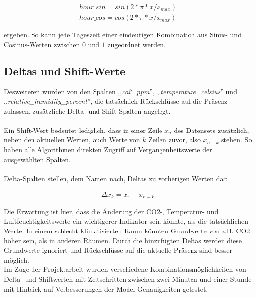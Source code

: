 \begin{align}
    hour\_sin = sin(2 * \pi * x / x_{max}) \\ 
    hour\_cos = cos(2 * \pi * x / x_{max})
\end{align} 

ergeben. So kann jede Tageszeit einer eindeutigen Kombination aus Sinus- und Cosinus-Werten zwischen 
$0$ und $1$ zugeordnet werden.

\subsection{Deltas und Shift-Werte}
Desweiteren wurden von den Spalten ,,\textit{co2\_ppm}'', ,,\textit{temperature\_celsius}'' und \break 
,,\textit{relative\_humidity\_percent}'', die tatsächlich Rückschlüsse auf die Präsenz zulassen, \break 
zusätzliche Delta- und Shift-Spalten angelegt.\\\\
Ein Shift-Wert bedeutet lediglich, dass  in einer Zeile $x_n$ des Datensets 
zusätzlich, neben den aktuellen Werten, auch Werte von $k$ Zeilen zuvor, also $x_{n-k}$ stehen. So haben 
alle Algorithmen direkten Zugriff auf Vergangenheitswerte der ausgewählten Spalten.\\\\
Delta-Spalten stellen, dem Namen nach, Deltas zu vorherigen Werten dar:

\begin{align}
    \Delta x_k = x_n - x_{n-k}    
\end{align}

Die Erwartung ist hier, dass die Änderung der CO2-, Temperatur- und 
Luftfeuchtigkeitswerte ein wichtigerer Indikator sein könnte, als die tatsächlichen Werte. In einem schlecht 
klimatisierten Raum könnten Grundwerte von z.B. CO2 höher sein, als in anderen Räumen. Durch die hinzufügten 
Deltas werden diese Grundwerte ignoriert und Rückschlüsse auf die aktuelle Präsenz sind besser möglich.\\
Im Zuge der Projektarbeit wurden verschiedene Kombinationsmöglichkeiten von Delta- und Shiftwerten mit 
Zeitschritten zwischen zwei Minuten und einer Stunde mit Hinblick auf Verbesserungen der Model-Genauigkeiten 
getestet.

 

